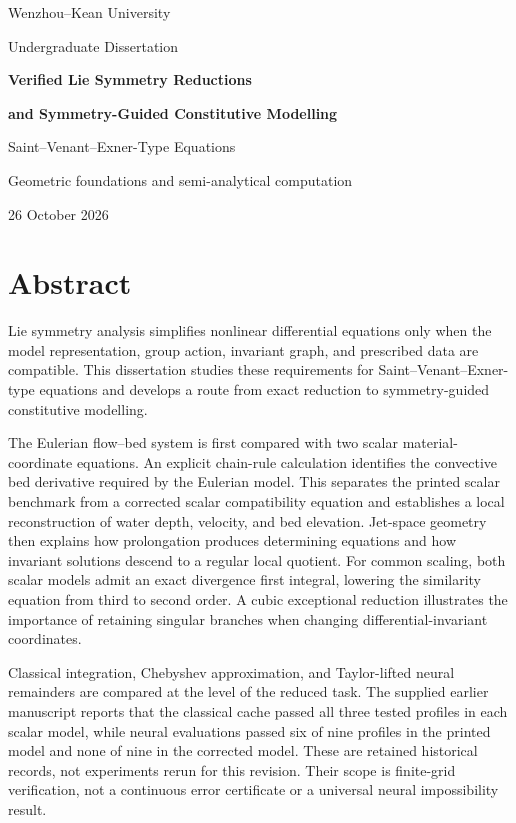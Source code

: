 \documentclass[11pt,a4paper,oneside]{report}
\numberwithin{equation}{chapter}
\begin{document}
\begin{titlepage}
\centering
{\large Wenzhou--Kean University\par}
\vspace{12mm}
{\large Undergraduate Dissertation\par}
\vspace{25mm}
{\LARGE\bfseries Verified Lie Symmetry Reductions\par}
\vspace{4mm}
{\LARGE\bfseries and Symmetry-Guided Constitutive Modelling\par}
\vspace{10mm}
{\Large Saint--Venant--Exner-Type Equations\par}
\vspace{15mm}
{\large Geometric foundations and semi-analytical computation\par}
\vfill
{\large 26 October 2026\par}
\end{titlepage}
\chapter*{Abstract}
Lie symmetry analysis simplifies nonlinear differential equations only when the model representation, group action, invariant graph, and prescribed data are compatible. This dissertation studies these requirements for Saint--Venant--Exner-type equations and develops a route from exact reduction to symmetry-guided constitutive modelling.

The Eulerian flow--bed system is first compared with two scalar material-coordinate equations. An explicit chain-rule calculation identifies the convective bed derivative required by the Eulerian model. This separates the printed scalar benchmark from a corrected scalar compatibility equation and establishes a local reconstruction of water depth, velocity, and bed elevation. Jet-space geometry then explains how prolongation produces determining equations and how invariant solutions descend to a regular local quotient. For common scaling, both scalar models admit an exact divergence first integral, lowering the similarity equation from third to second order. A cubic exceptional reduction illustrates the importance of retaining singular branches when changing differential-invariant coordinates.

Classical integration, Chebyshev approximation, and Taylor-lifted neural remainders are compared at the level of the reduced task. The supplied earlier manuscript reports that the classical cache passed all three tested profiles in each scalar model, while neural evaluations passed six of nine profiles in the printed model and none of nine in the corrected model. These are retained historical records, not experiments rerun for this revision. Their scope is finite-grid verification, not a continuous error certificate or a universal neural impossibility result.
\end{document}

